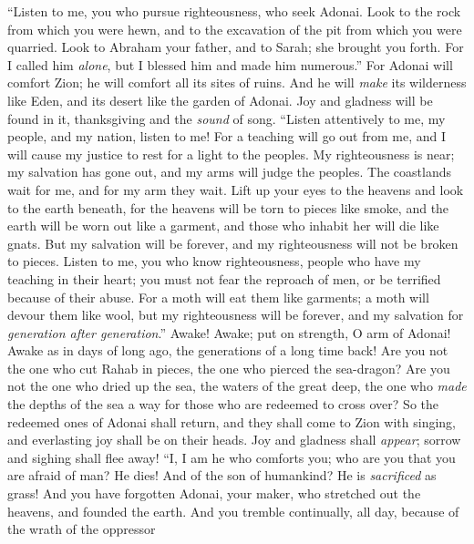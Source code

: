 \begin{biblechapter} %
 “Listen to me, you who pursue righteousness, 
who seek Adonai. 
Look to the rock from which you were hewn, 
and to the excavation of the pit from which you were quarried.
\verse Look to Abraham your father, 
and to Sarah; she brought you forth. 
For I called him \textit{alone}, 
but I blessed him and made him numerous.”
\verse For Adonai will comfort Zion; 
he will comfort all its sites of ruins. 
And he will \textit{make} its wilderness like Eden, 
and its desert like the garden of Adonai. 
Joy and gladness will be found in it, 
thanksgiving and the \textit{sound} of song.
\verse “Listen attentively to me, my people, 
and my nation, listen to me! 
For a teaching will go out from me, 
and I will cause my justice to rest for a light to the peoples.
\verse My righteousness is near; my salvation has gone out, 
and my arms will judge the peoples. 
The coastlands wait for me, 
and for my arm they wait.
\verse Lift up your eyes to the heavens 
and look to the earth beneath, 
for the heavens will be torn to pieces like smoke, 
and the earth will be worn out like a garment, 
and those who inhabit her will die like gnats. 
But my salvation will be forever, 
and my righteousness will not be broken to pieces.
\verse Listen to me, you who know righteousness, 
people who have my teaching in their heart; 
you must not fear the reproach of men, 
or be terrified because of their abuse.
\verse For a moth will eat them like garments; 
a moth will devour them like wool, 
but my righteousness will be forever, 
and my salvation for \textit{generation after generation}.”
\verse Awake! Awake; put on strength, O arm of Adonai! 
Awake as in days of long ago, 
the generations of a long time back! 
Are you not the one who cut Rahab in pieces, 
the one who pierced the sea-dragon?
\verse Are you not the one who dried up the sea, 
the waters of the great deep, 
the one who \textit{made} the depths of the sea a way 
for those who are redeemed to cross over?
\verse So the redeemed ones of Adonai shall return, 
and they shall come to Zion with singing, 
and everlasting joy shall be on their heads. 
Joy and gladness shall \textit{appear}; 
sorrow and sighing shall flee away!
\verse “I, I am he who comforts you; 
who are you that you are afraid of man? He dies! 
And of the son of humankind? He is \textit{sacrificed} as grass!
\verse And you have forgotten Adonai, your maker, 
who stretched out the heavens, 
and founded the earth. 
And you tremble continually, all day, 
because of the wrath of the oppressor 

\end{biblechapter}
